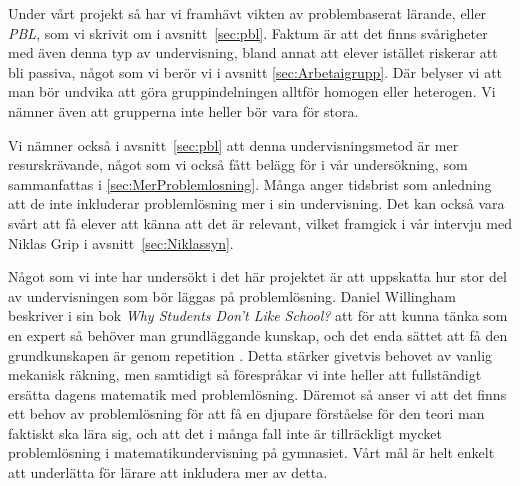 \textcolor{Mahogany}{Under vårt projekt så har vi framhävt vikten av problembaserat lärande, eller \textsl{PBL}, som vi skrivit om i avsnitt~\ref{sec:pbl}. Faktum är att det finns svårigheter med även denna typ av undervisning, bland annat att elever istället riskerar att bli passiva, något som vi berör vi i avsnitt \ref{sec:Arbetaigrupp}. Där belyser vi att man bör undvika att göra gruppindelningen alltför homogen eller heterogen. Vi nämner även att grupperna inte heller bör vara för stora.}

\textcolor{Mahogany}{Vi nämner också i avsnitt~\ref{sec:pbl} att denna undervisningsmetod är mer resurskrävande, något som vi också fått belägg för i vår undersökning, som sammanfattas i \ref{sec:MerProblemlosning}. Många anger tidsbrist som anledning att de inte inkluderar problemlösning mer i sin undervisning. Det kan också vara svårt att få elever att känna att det är relevant, vilket framgick i vår intervju med Niklas Grip i avsnitt~\ref{sec:Niklassyn}.}

\textcolor{Mahogany}{Något som vi inte har undersökt i det här projektet är att uppskatta hur stor del av undervisningen som bör läggas på problemlösning.} \textcolor{turkos}{Daniel Willingham beskriver i sin bok \textsl{Why Students Don't Like School?} att för att kunna tänka som en expert så behöver man grundläggande kunskap, och det enda sättet att få den grundkunskapen är genom repetition \cite{WhyDontStudents}. }\textcolor{Mahogany}{Detta stärker givetvis behovet av vanlig mekanisk räkning, men samtidigt så förespråkar vi inte heller att fullständigt ersätta dagens matematik med problemlösning. Däremot så anser vi att det finns ett behov av problemlösning för att få en djupare förståelse för den teori man faktiskt ska lära sig, och att det i många fall inte är tillräckligt mycket problemlösning i matematikundervisning på gymnasiet. Vårt mål är helt enkelt att underlätta för lärare att inkludera mer av detta.}